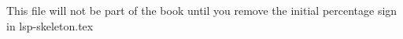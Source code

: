 This file will not be part of the book until you remove the initial percentage sign in lsp-skeleton.tex